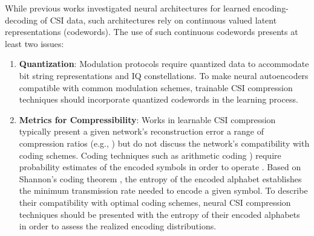 


While previous works investigated neural architectures for learned encoding-decoding of CSI data, such architectures rely on continuous valued latent representations (codewords). The use of such continuous codewords presents at least two issues:
\begin{enumerate}
	\item \textbf{Quantization}: Modulation protocols require quantized data to accommodate bit string representations and IQ constellations. To make neural autoencoders compatible with common modulation schemes, trainable CSI compression techniques should incorporate quantized codewords in the learning process.
	\item \textbf{Metrics for Compressibility}: Works in learnable CSI compression typically present a given network's reconstruction error a range of compression ratios (e.g., \cite{ref:csinet,ref:dualnet}) but do not discuss the network's compatibility with coding schemes. Coding techniques such as arithmetic coding \cite{ref:Witten1987Arithmetic}) require probability estimates of the encoded symbols in order to operate \cite{ref:Howard1994Arithmetic}. Based on Shannon's coding theorem \cite{ref:Shannon1948Mathematical}, the entropy of the encoded alphabet establishes the minimum transmission rate needed to encode a given symbol. To describe their compatibility with optimal coding schemes, neural CSI compression techniques should be presented with the entropy of their encoded alphabets in order to assess the realized encoding distributions.
\end{enumerate}

